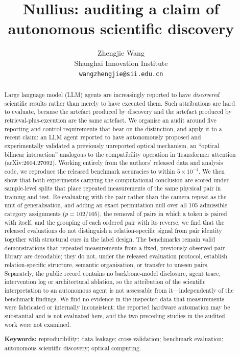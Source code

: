\documentclass[11pt,a4paper]{article}
\title{\bfseries Nullius: auditing a claim of autonomous scientific discovery}
\author{Zhengjie Wang\\[2pt]
\small Shanghai Innovation Institute\\
\small \texttt{wangzhengjie@sii.edu.cn}}
\date{}
\newcommand{\target}{arXiv:2604.27092}
\begin{document}
\maketitle

\begin{abstract}
\noindent
Large language model (LLM) agents are increasingly reported to have
\emph{discovered} scientific results rather than merely to have executed
them. Such attributions are hard to evaluate, because the artefact produced by
discovery and the artefact produced by retrieval-plus-execution are the same
artefact. We organise an audit around five reporting and control requirements
that bear on the distinction, and apply it to a recent
claim: an LLM agent reported to have autonomously proposed and experimentally
validated a previously unreported optical mechanism, an ``optical bilinear
interaction'' analogous to the compatibility operation in Transformer
attention (\target{}). Working entirely from the authors' released data and
analysis code, we reproduce the released benchmark accuracies to within
$5\times10^{-4}$. We then show that both experiments carrying the
computational conclusion are scored under sample-level splits that place
repeated measurements of the same physical pair in training and test.
Re-evaluating with the pair rather than the camera repeat as the unit of
generalisation, and adding an exact permutation null over all 105 admissible
category assignments ($p = 102/105$), the removal of pairs in which a token is
paired with itself, and the grouping of each ordered pair with its reverse, we
find that the released evaluations do not distinguish a relation-specific
signal from pair identity together with structural cues in the label design. The
benchmarks remain valid demonstrations that repeated measurements from a
fixed, previously observed pair library are decodable; they do not, under the
released evaluation protocol, establish relation-specific structure, semantic
organisation, or transfer to unseen pairs. Separately, the public record
contains no backbone-model disclosure, agent trace, intervention log or
architectural ablation, so the attribution of the scientific interpretation to
an autonomous agent is not assessable from it---independently of the benchmark
findings. We find no evidence in the inspected data that measurements were
fabricated or internally inconsistent; the reported hardware automation may be
substantial and is not evaluated here, and the two preceding studies in the
audited work were not examined.

\vspace{0.7em}
\noindent\textbf{Keywords:} reproducibility; data leakage; cross-validation;
benchmark evaluation; autonomous scientific discovery; optical computing.
\end{abstract}
\end{document}
